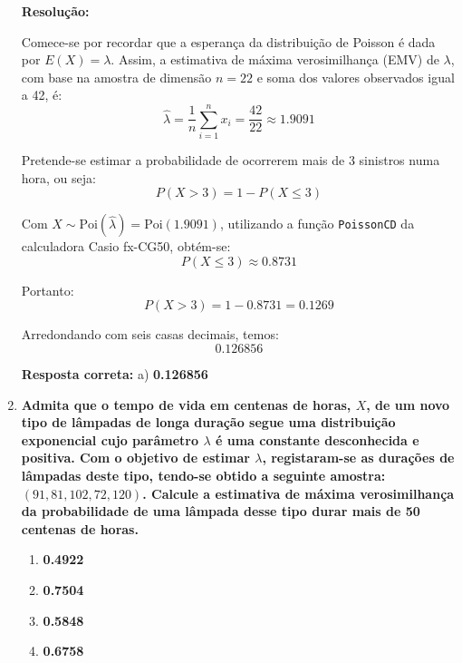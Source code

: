 \documentclass[a4paper,12pt]{article}
\begin{document}
\begin{enumerate}
    \vspace{0.3cm}

    \begin{mdframed}[backgroundcolor=gray!10, linewidth=0pt, innertopmargin=10pt, innerbottommargin=10pt]
    \textbf{Resolução:}

    Comece-se por recordar que a esperança da distribuição de Poisson é dada por \( E(X) = \lambda \). Assim, a estimativa de máxima verosimilhança (EMV) de \( \lambda \), com base na amostra de dimensão \( n = 22 \) e soma dos valores observados igual a 42, é:
    \[
    \hat{\lambda} = \frac{1}{n} \sum_{i=1}^{n} x_i = \frac{42}{22} \approx 1.9091
    \]

    Pretende-se estimar a probabilidade de ocorrerem mais de 3 sinistros numa hora, ou seja:
    \[
    P(X > 3) = 1 - P(X \leq 3)
    \]

    Com \( X \sim \text{Poi}(\hat{\lambda}) = \text{Poi}(1.9091) \), utilizando a função \texttt{PoissonCD} da calculadora Casio fx-CG50, obtém-se:
    \[
    P(X \leq 3) \approx 0.8731
    \]

    Portanto:
    \[
    P(X > 3) = 1 - 0.8731 = 0.1269
    \]

    Arredondando com seis casas decimais, temos:
    \[
    \boxed{0.126856}
    \]

    \textbf{Resposta correta:} a) \textbf{0.126856}
    \end{mdframed}

    \vspace{0.5cm}

    \item \textbf{Admita que o tempo de vida em centenas de horas, \( X \), de um novo tipo de lâmpadas de longa duração segue uma distribuição exponencial cujo parâmetro \( \lambda \) é uma constante desconhecida e positiva. Com o objetivo de estimar \( \lambda \), registaram-se as durações de lâmpadas deste tipo, tendo-se obtido a seguinte amostra: \( (91, 81, 102, 72, 120) \). Calcule a estimativa de máxima verosimilhança da probabilidade de uma lâmpada desse tipo durar mais de 50 centenas de horas.}

    \vspace{0.3cm}

    \begin{enumerate}[label=\alph*)]
        \item \textbf{0.4922}
        \item \textbf{0.7504}
        \item \textbf{0.5848}
        \item \textbf{0.6758}
    \end{enumerate}


\end{enumerate}
\end{document}
